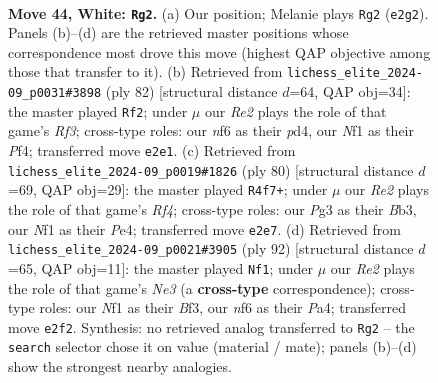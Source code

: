 \documentclass[11pt]{article}
\begin{document}
\clearpage

\begin{figure}[p]\centering
\begin{subfigure}{0.46\textwidth}\centering
\resizebox{\linewidth}{!}{%
\newchessgame
\chessboard[
  setfen={5k2/1b3p2/5np1/7p/8/5qP1/1R2R2P/5NK1 w - - 0 44},
  showmover=false,
  pgfstyle=straightmove, color=movearrow, markmove={e2-g2}
]}
\caption{}
\end{subfigure}\hfill
\begin{subfigure}{0.46\textwidth}\centering
\resizebox{\linewidth}{!}{%
\newchessgame
\chessboard[
  setfen={8/6pk/3Q3p/3b1p2/3pqP2/5R1P/6PK/8 w - - 4 42},
  showmover=false,
  pgfstyle=straightmove, color=movearrow, markmove={f3-f2}
]}
\caption{}
\end{subfigure}
\\[4pt]
\begin{subfigure}{0.46\textwidth}\centering
\resizebox{\linewidth}{!}{%
\newchessgame
\chessboard[
  setfen={5R2/2p3kp/p2p4/2b1q3/1p2PRK1/1B5P/P7/8 w - - 12 41},
  showmover=false,
  pgfstyle=straightmove, color=movearrow, markmove={f4-f7}
]}
\caption{}
\end{subfigure}\hfill
\begin{subfigure}{0.46\textwidth}\centering
\resizebox{\linewidth}{!}{%
\newchessgame
\chessboard[
  setfen={7k/8/p3p3/2p1q3/P1R4P/1P2NB2/2P2K2/8 w - - 0 47},
  showmover=false,
  pgfstyle=straightmove, color=movearrow, markmove={e3-f1}
]}
\caption{}
\end{subfigure}
\caption{\textbf{Move 44, White: \texttt{Rg2}.} (a) Our position; Melanie plays \texttt{Rg2} (\texttt{e2g2}). Panels (b)--(d) are the retrieved master positions whose correspondence most drove this move (highest QAP objective among those that transfer to it). (b) Retrieved from \texttt{lichess\_elite\_2024-09\_p0031\#3898} (ply 82) [structural distance $d$=64, QAP obj=34]: the master played \texttt{Rf2}; under $\mu$ our \emph{Re2} plays the role of that game's \emph{Rf3}; cross-type roles: our \emph{n}f6 as their \emph{p}d4, our \emph{N}f1 as their \emph{P}f4; transferred move \texttt{e2e1}. (c) Retrieved from \texttt{lichess\_elite\_2024-09\_p0019\#1826} (ply 80) [structural distance $d$=69, QAP obj=29]: the master played \texttt{R4f7+}; under $\mu$ our \emph{Re2} plays the role of that game's \emph{Rf4}; cross-type roles: our \emph{P}g3 as their \emph{B}b3, our \emph{N}f1 as their \emph{P}e4; transferred move \texttt{e2e7}. (d) Retrieved from \texttt{lichess\_elite\_2024-09\_p0021\#3905} (ply 92) [structural distance $d$=65, QAP obj=11]: the master played \texttt{Nf1}; under $\mu$ our \emph{Re2} plays the role of that game's \emph{Ne3} (a \textbf{cross-type} correspondence); cross-type roles: our \emph{N}f1 as their \emph{B}f3, our \emph{n}f6 as their \emph{P}a4; transferred move \texttt{e2f2}. Synthesis: no retrieved analog transferred to \texttt{Rg2} -- the \texttt{search} selector chose it on value (material / mate); panels (b)--(d) show the strongest nearby analogies.}
\label{fig:thought-m86}
\end{figure}
\end{document}
